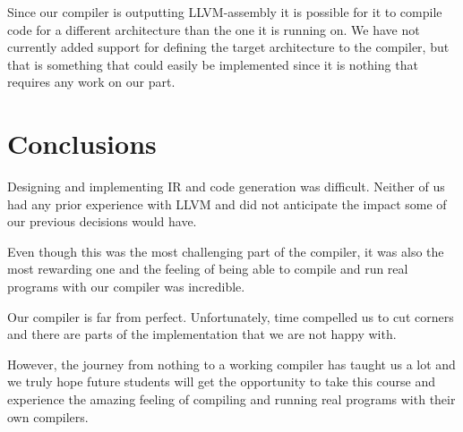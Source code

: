 
Since our compiler is outputting LLVM-assembly it is possible for it to compile code for a different architecture than the one it is running on. We have not currently added support for defining the target architecture to the compiler, but that is something that could easily be implemented since it is nothing that requires any work on our part.

\section{Conclusions}

Designing and implementing IR and code generation was difficult. Neither of us had any prior experience with LLVM and did not anticipate the impact some of our previous decisions would have.

Even though this was the most challenging part of the compiler, it was also the most rewarding one and the feeling of being able to compile and run real programs with our compiler was incredible.

Our compiler is far from perfect. Unfortunately, time compelled us to cut corners and there are parts of the implementation that we are not happy with.

However, the journey from nothing to a working compiler has taught us a lot and we truly hope future students will get the opportunity to take this course and experience the amazing feeling of compiling and running real programs with their own compilers.

